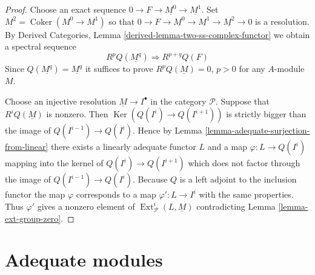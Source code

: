 \documentclass{stacks-project}
\theoremstyle{plain}
\theoremstyle{definition}
\theoremstyle{remark}
\numberwithin{equation}{subsection}
\def\Ext{\mathop{\mathrm{Ext}}\nolimits}
\def\Ker{\mathop{\mathrm{Ker}}}
\def\Coker{\mathop{\mathrm{Coker}}}
\begin{document}
\begin{proof}
Choose an exact sequence $0 \to F \to \underline{M^0} \to \underline{M^1}$.
Set $M^2 = \Coker(M^0 \to M^1)$ so that
$0 \to F \to \underline{M^0} \to \underline{M^1}
\to \underline{M^2} \to 0$ is a resolution. By
Derived Categories, Lemma \ref{derived-lemma-two-ss-complex-functor}
we obtain a spectral sequence
$$
R^pQ(\underline{M^q}) \Rightarrow R^{p + q}Q(F)
$$
Since $Q(\underline{M^q}) = \underline{M^q}$ it suffices to prove
$R^pQ(\underline{M}) = 0$, $p > 0$ for any $A$-module $M$.

\medskip\noindent
Choose an injective resolution $\underline{M} \to I^\bullet$ in
the category $\mathcal{P}$. Suppose that $R^iQ(\underline{M})$ is nonzero.
Then $\Ker(Q(I^i) \to Q(I^{i + 1}))$ is strictly bigger
than the image of $Q(I^{i - 1}) \to Q(I^i)$. Hence by
Lemma \ref{lemma-adequate-surjection-from-linear}
there exists a linearly adequate functor $L$ and a map
$\varphi : L \to Q(I^i)$ mapping into the kernel of $Q(I^i) \to Q(I^{i + 1})$
which does not factor through the image of $Q(I^{i - 1}) \to Q(I^i)$.
Because $Q$ is a left adjoint to the inclusion functor the map
$\varphi$ corresponds to a map $\varphi' : L \to I^i$ with the same properties.
Thus $\varphi'$ gives a nonzero element of
$\Ext^i_\mathcal{P}(L, \underline{M})$ contradicting
Lemma \ref{lemma-ext-group-zero}.
\end{proof}














\section{Adequate modules}
\label{section-adequate}
\end{document}
